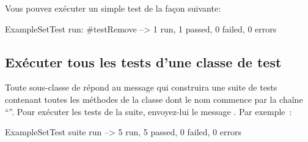 \documentclass[a4paper,10pt,twoside]{book}
\begin{document}
Vous pouvez exécuter un simple test de la façon suivante:
% 

\begin{code}{}
ExampleSetTest run: #testRemove --> 1 run, 1 passed, 0 failed, 0 errors
\end{code}

\subsection{Exécuter tous les tests d'une classe de test}

Toute sous-classe de  répond au message  qui construira une suite de tests contenant toutes les méthodes de la classe dont le nom commence par la chaîne ``''.
Pour exécuter les tests de la suite, envoyez-lui le message .
Par exemple~:

\begin{code}{}
ExampleSetTest suite run --> 5 run, 5 passed, 0 failed, 0 errors
\end{code}

\end{document}
